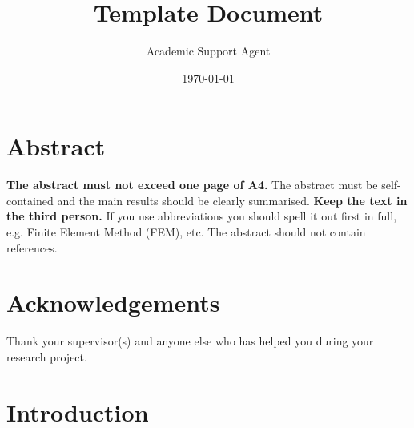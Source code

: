 \documentclass{article}
\title{Template Document}
\author{Academic Support Agent}
\date{\today}
\begin{document}
\maketitle

\frontMatter


\section*{Abstract}
\label{sec:abstract}

\textbf{The abstract must not exceed one page of A4.} The abstract must be self-contained and the main results should be clearly summarised. \textbf{Keep the text in the third person.} If you use abbreviations you should spell it out first in full, e.g. Finite Element Method (FEM), etc. The abstract should not contain references.





\section*{Acknowledgements}
\label{sec:ack}

Thank your supervisor(s) and anyone else who has helped you during your research project.











\section{Introduction}
\label{sec:introduction}
\end{document}
